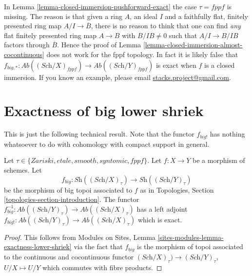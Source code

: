 \begin{remark}
\label{remark-fppf-closed-immersion-not-closed}
In Lemma \ref{lemma-closed-immersion-pushforward-exact} the case $\tau = fppf$
is missing. The reason is that given a ring $A$, an ideal $I$ and a
faithfully flat, finitely presented ring map $A/I \to \overline{B}$, there
is no reason to think that one can find {\it any} flat finitely presented ring
map $A \to B$ with $B/IB \not = 0$ such that $A/I \to B/IB$ factors through
$\overline{B}$. Hence the proof of
Lemma \ref{lemma-closed-immersion-almost-cocontinuous}
does not work for the fppf topology.
In fact it is likely false that
$f_{big,*} : \textit{Ab}((\textit{Sch}/X)_{fppf})
\to \textit{Ab}((\textit{Sch}/Y)_{fppf})$
is exact when $f$ is a closed immersion.
If you know an example, please email
\href{mailto:stacks.project@gmail.com}{stacks.project@gmail.com}.
\end{remark}












\section{Exactness of big lower shriek}
\label{section-exactness-lower-shriek}

\noindent
This is just the following technical result. Note that the functor $f_{big!}$
has nothing whatsoever to do with cohomology with compact support in
general.

\begin{lemma}
\label{lemma-exactness-lower-shriek}
Let $\tau \in \{Zariski, etale, smooth, syntomic, fppf\}$.
Let $f : X \to Y$ be a morphism of schemes. Let
$$
f_{big} :
\textit{Sh}((\textit{Sch}/X)_\tau)
\longrightarrow
\textit{Sh}((\textit{Sch}/Y)_\tau)
$$
be the morphism of big topoi associated to $f$ as in
Topologies, Section \ref{topologies-section-introduction}. The functor
$f_{big}^{-1} :
\textit{Ab}((\textit{Sch}/Y)_\tau)
\to
\textit{Ab}((\textit{Sch}/X)_\tau)$
has a left adjoint
$f_{big!} : 
\textit{Ab}((\textit{Sch}/Y)_\tau)
\to
\textit{Ab}((\textit{Sch}/X)_\tau)$
which is exact.
\end{lemma}

\begin{proof}
This follows from
Modules on Sites, Lemma \ref{sites-modules-lemma-exactness-lower-shriek}
via the fact that $f_{big}$ is the morphism of topoi associated
to the  continuous and cocontinuous functor
$(\textit{Sch}/X)_\tau) \to (\textit{Sch}/Y)_\tau$, $U/X \mapsto U/Y$
which commutes with fibre products.
\end{proof}












